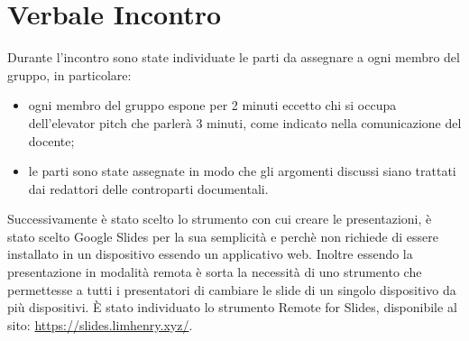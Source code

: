 \section{Verbale Incontro}
    Durante l'incontro sono state individuate le parti da assegnare a ogni membro del gruppo, in particolare:
    \begin{itemize}
        \item ogni membro del gruppo espone per 2 minuti eccetto chi si occupa dell'elevator pitch che parlerà 3 minuti, come indicato nella comunicazione del docente;
        \item le parti sono state assegnate in modo che gli argomenti discussi siano trattati dai redattori delle controparti documentali.
    \end{itemize}
    Successivamente è stato scelto lo strumento con cui creare le presentazioni, è stato scelto Google Slides per la sua semplicità e perchè non richiede di essere installato in un dispositivo essendo un applicativo web. Inoltre essendo la presentazione in modalità remota è sorta la necessità di uno strumento che permettesse a tutti i presentatori di cambiare le slide di un singolo dispositivo da più dispositivi. È stato individuato lo strumento Remote for Slides, disponibile al sito: \href{https://slides.limhenry.xyz/}{https://slides.limhenry.xyz/}.